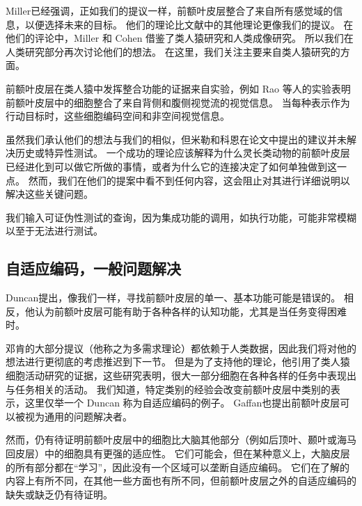 Miller\cite{miller2001integrative}已经强调，正如我们的提议一样，前额叶皮层整合了来自所有感觉域的信息，以便选择未来的目标。
他们的理论比文献中的其他理论更像我们的提议。
在他们的评论中，Miller 和 Cohen 借鉴了类人猿研究和人类成像研究。
所以我们在人类研究部分再次讨论他们的想法。
在这里，我们关注主要来自类人猿研究的方面。
\par 


前额叶皮层在类人猿中发挥整合功能的证据来自实验，例如 Rao 等人的实验\cite{rao1997integration}表明前额叶皮层中的细胞整合了来自背侧和腹侧视觉流的视觉信息。
当每种表示作为行动目标时，这些细胞编码空间和非空间视觉信息。
\par


虽然我们承认他们的想法与我们的相似，但米勒和科恩\cite{miller2001integrative}在论文中提出的建议并未解决历史或特异性测试。
一个成功的理论应该解释为什么灵长类动物的前额叶皮层已经进化到可以做它所做的事情，或者为什么它的连接决定了如何单独做到这一点。
然而，我们在他们的提案中看不到任何内容，这会阻止对其进行详细说明以解决这些关键问题。
\par


我们输入可证伪性测试的查询，因为集成功能的调用，如执行功能，可能非常模糊以至于无法进行测试。



\subsection{自适应编码，一般问题解决}
Duncan\cite{duncan2001adaptive}提出，像我们一样，寻找前额叶皮层的单一、基本功能可能是错误的。
相反，他认为前额叶皮层可能有助于各种各样的认知功能，尤其是当任务变得困难时。
\par


邓肯的大部分提议（他称之为多需求理论）都依赖于人类数据，因此我们将对他的想法进行更彻底的考虑推迟到下一节。
但是为了支持他的理论，他引用了类人猿细胞活动研究的证据，这些研究表明，很大一部分细胞在各种各样的任务中表现出与任务相关的活动。
我们知道，特定类别的经验会改变前额叶皮层中类别的表示\cite{roy2010prefrontal}，这里仅举一个 Duncan 称为自适应编码的例子。
Gaffan\cite{gaffan2002interaction}也提出前额叶皮层可以被视为通用的问题解决者。
\par


然而，仍有待证明前额叶皮层中的细胞比大脑其他部分（例如后顶叶、颞叶或海马回皮层）中的细胞具有更强的适应性。
它们可能会，但在某种意义上，大脑皮层的所有部分都在“学习”，因此没有一个区域可以垄断自适应编码。
它们在了解的内容上有所不同，在其他一些方面也有所不同，但前额叶皮层之外的自适应编码的缺失或缺乏仍有待证明。
\par


